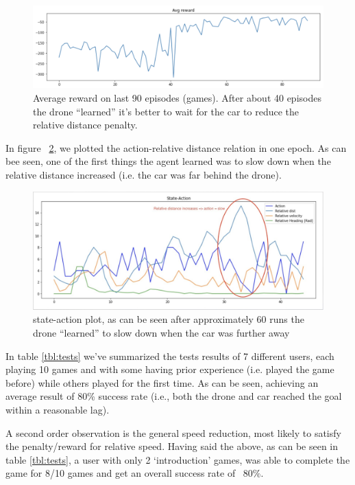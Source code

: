 \documentclass[a4paper,11pt]{article}
\begin{document}
\begin{figure}[h]
    \centering
    \includegraphics[width=.9\textwidth]{reward.png}
    \caption{Average reward on last 90 episodes (games). After about 40 episodes the drone “learned” it's better to wait for the car to reduce the relative distance penalty.}
    \label{fig:reward}
\end{figure}

\newpage
In figure ~\ref{fig:Epoch}, we plotted the action-relative distance relation in one epoch. As can bee seen, one of the first things the agent learned was to slow down when the relative distance increased (i.e. the car was far behind the drone). 

\begin{figure}[h]
    \centering
    \includegraphics[width=.8\textwidth]{epoch.jpeg}
    \caption{state-action plot, as can be seen after approximately 60 runs the drone “learned” to slow down when the car was further away}
    \label{fig:Epoch}
\end{figure}

In table \ref{tbl:tests} we've summarized the tests results of 7 different users, each playing 10 games and with some having prior experience (i.e. played the game before) while others played for the first time. As can be seen, achieving an average result of 80\% success rate (i.e., both the drone and car reached the goal within a reasonable lag).

A second order observation is the general speed reduction, most likely to satisfy the penalty/reward for relative speed. Having said the above, as can be seen in table \ref{tbl:tests}, a user with only 2 ‘introduction’ games, was able to complete the game for 8/10 games and get an overall success rate of ~80\%.\\
\end{document}
